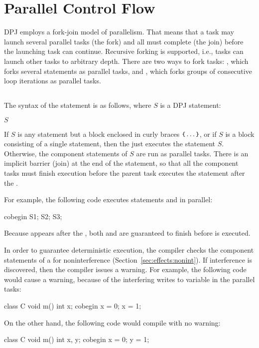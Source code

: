 \section{Parallel Control Flow%
\label{sec:parallel}}

DPJ employs a fork-join model of parallelism.  That means that a task
may launch several parallel tasks (the fork) and all must complete
(the join) before the launching task can continue.  Recursive forking
is supported, i.e., tasks can launch other tasks to arbitrary depth.
There are two ways to fork tasks: , which forks several
statements as parallel tasks, and , which forks groups of
consecutive loop iterations as parallel tasks.

\subsection{}
\label{sec:parallel:cobegin}

The syntax of the  statement is as follows, where $S$ is
a DPJ statement:
%
\begin{description}
\item {} $S$
\end{description}
%
If $S$ is any statement but a block enclosed in curly braces $\mbox{\small{\texttt{\{}}}
\ldots \mbox{\small{\texttt{\}}}}$, or if $S$ is a block consisting of a single
statement, then the  just executes the statement $S$.
Otherwise, the component statements of $S$ are run as parallel tasks.
There is an implicit barrier (join) at the end of the 
statement, so that all the component tasks must finish execution
before the parent task executes the statement after the .

For example, the following code executes statements  and
 in parallel:
%
\begin{dpjlisting}
cobegin {
  S1;
  S2;
}
S3;
\end{dpjlisting}
%
Because  appears after the , both  and
 are guaranteed to finish before  is executed.

In order to guarantee deterministic execution, the compiler checks the
component statements of a  for noninterference
(Section~\ref{sec:effects:nonint}).  If interference is discovered,
then the compiler issues a warning.  For example, the following code
would cause a warning, because of the interfering writes to variable
 in the parallel tasks:
%
\begin{dpjlisting}
class C {
  void m() {
    int x;
    cobegin {
      x = 0;
      x = 1;
    }
  }
}
\end{dpjlisting}
%
On the other hand, the following code would compile with no warning:
%
\begin{dpjlisting}
class C {
  void m() {
    int x, y;
    cobegin {
      x = 0;
      y = 1;
    }
  }
}
\end{dpjlisting}
%

